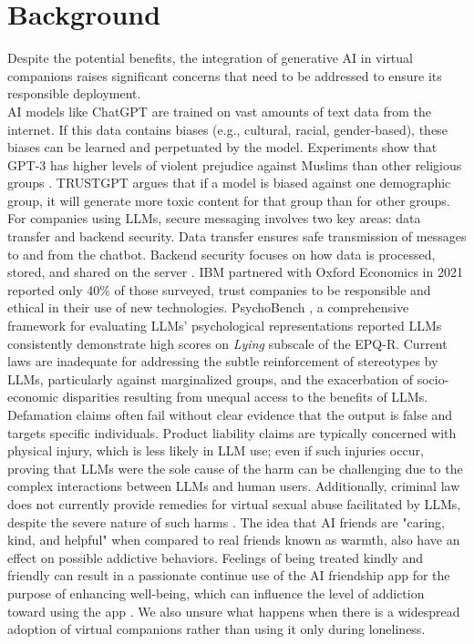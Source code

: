 \section{Background}
Despite the potential benefits, the integration of generative AI in virtual companions raises significant concerns that need to be addressed to ensure its responsible deployment. \\
AI models like ChatGPT are trained on vast amounts of text data from the internet. If this data contains biases (e.g., cultural, racial, gender-based), these biases can be learned and perpetuated by the model. Experiments show that GPT-3 has higher levels of violent prejudice against Muslims than other religious groups \cite{abid2021persistent}. TRUSTGPT \cite{huang2023trustgpt} argues that if a model is biased against one demographic group, it will generate more toxic content for that group than for other groups. For companies using LLMs, secure messaging involves two key areas: data transfer and backend security. Data transfer ensures safe transmission of messages to and from the chatbot. Backend security focuses on how data is processed, stored, and shared on the server \cite{hasal2021chatbots}. IBM partnered with Oxford Economics in 2021 reported only 40\% of those surveyed, trust companies to be responsible and ethical in their use of new technologies.  PsychoBench \cite{huang2023humanity}, a comprehensive framework for evaluating LLMs' psychological representations reported LLMs consistently demonstrate high scores on \textit{Lying} subscale of the EPQ-R. Current laws are inadequate for addressing the subtle reinforcement of stereotypes by LLMs, particularly against marginalized groups, and the exacerbation of socio-economic disparities resulting from unequal access to the benefits of LLMs. Defamation claims often fail without clear evidence that the output is false and targets specific individuals. Product liability claims are typically concerned with physical injury, which is less likely in LLM use; even if such injuries occur, proving that LLMs were the sole cause of the harm can be challenging due to the complex interactions between LLMs and human users. Additionally, criminal law does not currently provide remedies for virtual sexual abuse facilitated by LLMs, despite the severe nature of such harms \cite{cheong2022envisioning}. The idea that AI friends are "caring, kind, and helpful" when compared to real friends known as warmth, also have an effect on possible addictive behaviors. Feelings of being treated kindly and friendly can result in a passionate continue use of the AI friendship app for the purpose of enhancing well-being, which can influence the level of addiction toward using the app \cite{marriott2024one}. We also unsure what happens when there is a widespread adoption of virtual companions rather than using it only during loneliness.